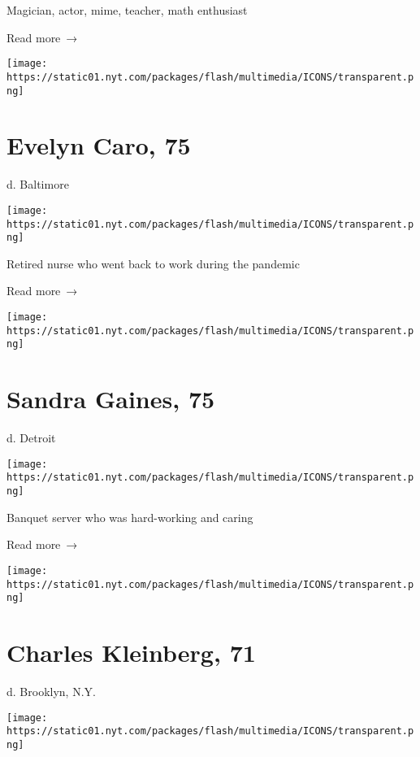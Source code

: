 Magician, actor, mime, teacher, math enthusiast

 Read more~→

\href{https://www.nytimes.com/2020/06/08/obituaries/evelyn-caro-dead-coronavirus.html}{}

\texttt{[image: https://static01.nyt.com/packages/flash/multimedia/ICONS/transparent.png]}

\hypertarget{evelyn-caro-75}{%
\section{Evelyn Caro, 75}\label{evelyn-caro-75}}

d. Baltimore

\texttt{[image: https://static01.nyt.com/packages/flash/multimedia/ICONS/transparent.png]}

Retired nurse who went back to work during the pandemic

 Read more~→

\href{https://www.nytimes.com/2020/06/06/obituaries/sandra-gaines-dead-coronavirus.html}{}

\texttt{[image: https://static01.nyt.com/packages/flash/multimedia/ICONS/transparent.png]}

\hypertarget{sandra-gaines-75}{%
\section{Sandra Gaines, 75}\label{sandra-gaines-75}}

d. Detroit

\texttt{[image: https://static01.nyt.com/packages/flash/multimedia/ICONS/transparent.png]}

Banquet server who was hard-working and caring

 Read more~→

\href{https://www.nytimes.com/2020/06/05/obituaries/charles-kleinberg-dead-coronavirus.html}{}

\texttt{[image: https://static01.nyt.com/packages/flash/multimedia/ICONS/transparent.png]}

\hypertarget{charles-kleinberg-71}{%
\section{Charles Kleinberg, 71}\label{charles-kleinberg-71}}

d. Brooklyn, N.Y.

\texttt{[image: https://static01.nyt.com/packages/flash/multimedia/ICONS/transparent.png]}

